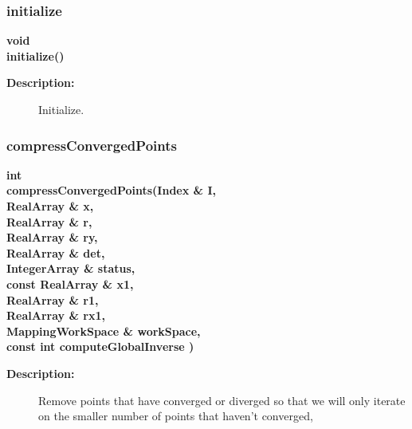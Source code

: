 \subsubsection{initialize}
 
\begin{flushleft} \textbf{%
void  \\ 
\settowidth{\ExactLocalInverseIncludeArgIndent}{initialize(}%
initialize()
}\end{flushleft}
\begin{description}
\item[{\bf Description:}] 
   Initialize.
\end{description}
\subsubsection{compressConvergedPoints}
 
\begin{flushleft} \textbf{%
int  \\ 
\settowidth{\ExactLocalInverseIncludeArgIndent}{compressConvergedPoints(}%
compressConvergedPoints(Index \& I,\\ 
\hspace{\ExactLocalInverseIncludeArgIndent}RealArray \& x, \\ 
\hspace{\ExactLocalInverseIncludeArgIndent}RealArray \& r, \\ 
\hspace{\ExactLocalInverseIncludeArgIndent}RealArray \& ry, \\ 
\hspace{\ExactLocalInverseIncludeArgIndent}RealArray \& det, \\ 
\hspace{\ExactLocalInverseIncludeArgIndent}IntegerArray \& status,\\ 
\hspace{\ExactLocalInverseIncludeArgIndent}const RealArray \& x1, \\ 
\hspace{\ExactLocalInverseIncludeArgIndent}RealArray \& r1, \\ 
\hspace{\ExactLocalInverseIncludeArgIndent}RealArray \& rx1, \\ 
\hspace{\ExactLocalInverseIncludeArgIndent}MappingWorkSpace \& workSpace,\\ 
\hspace{\ExactLocalInverseIncludeArgIndent}const int computeGlobalInverse )
}\end{flushleft}
\begin{description}
\item[{\bf Description:}] 
   Remove points that have converged or diverged so that we will only iterate
  on the smaller number of points that haven't converged,
\end{description}

